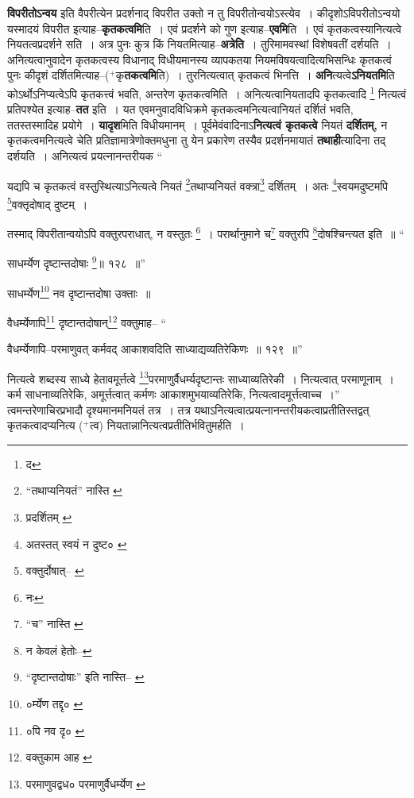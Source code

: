 \documentclass[article,12pt,a4paper]{memoir}
\newcommand{\add}[1]{($^{+}$#1)}
\begin{document}
	  \pstart \textbf{विपरीतोऽन्वय} इति वैपरीत्येन प्रदर्शनाद् विपरीत उक्तो न तु विपरीतोन्वयोऽस्त्येव । कीदृशोऽविपरीतोऽन्वयो यस्मादयं विपरीत इत्याह--\textbf{कृतकत्वमि}ति । एवं प्रदर्शने को गुण इत्याह--\textbf{एवमि}ति । एवं कृतकत्वस्यानित्यत्वे नियतत्वप्रदर्शने सति । अत्र पुनः कुत्र किं नियतमित्याह--\textbf{अत्रेति} । तुरिमामवस्थां विशेषवतीं दर्शयति । अनित्यत्वानुवादेन कृतकत्वस्य विधानाद् विधीयमानस्य व्यापकतया नियमविषयत्वादित्यभिसन्धिः कृतकत्वं पुनः कीदृशं दर्शितमित्याह--\add{कृ\textbf{तकत्वमि}ति} । तुरनित्यत्वात् कृतकत्वं भिनत्ति । \textbf{अनि}त्यत्वे\textbf{ऽनियतमि}ति कोऽर्थोऽनिप्यत्वेऽपि कृतकत्त्वं भवति, अन्तरेण कृतकत्वमिति । अनित्यत्वानियतादपि कृतकत्वादि \footnote{द} नित्यत्वं प्रतिपश्येत इत्याह--\textbf{तत} इति । यत एवमनुवादविधिक्रमे कृतकत्वमनित्यत्वानियतं दर्शितं भवति, ततस्तस्मादिह प्रयोगे । \textbf{यादृश}मिति विधीयमानम् । पूर्वमेवंवादिनाऽ\textbf{नित्यत्वं कृतकत्वे} नियतं \textbf{दर्शितम्,} न कृतकत्वमनित्यत्वे चेति प्रतिज्ञामात्रेणोक्तमधुना तु येन प्रकारेण तस्यैव प्रदर्शनमायातं \textbf{तथाही}त्यादिना तद् दर्शयति । अनित्यत्वं प्रयत्नानन्तरीयक  \leavevmode{} “
	  
	यद्यपि च कृतकत्वं वस्तुस्थित्याऽनित्यत्वे नियतं \footnote{“तथाप्यनियतं” नास्ति \cite{dp-msB}}\-तथाप्यनियतं वक्त्रा\footnote{प्रदर्शितम् \cite{dp-msC}} दर्शितम् । अतः \footnote{अतस्तत् स्वयं न दुष्ट० \cite{dp-msA} \cite{dp-msB} \cite{dp-edP} \cite{dp-edH} \cite{dp-edE} \cite{dp-edN}}\-स्वयमदुष्टमपि \footnote{वक्तुर्दोषात्--\cite{dp-msA} \cite{dp-edP} \cite{dp-edH} \cite{dp-edE}}\-वक्तृदोषाद् दुष्टम् । 
	  
	तस्माद् विपरीतान्वयोऽपि वक्तुरपराधात्, न वस्तुतः \footnote{नः} । परार्थानुमाने च\footnote{“च” नास्ति \cite{dp-msC} \cite{dp-msD}} वक्तुरपि \footnote{न केवलं हेतोः--\cite{dp-msD-n}}\-दोषश्चिन्त्यत इति ॥ “
	  
	साधर्म्येण दृष्टान्तदोषाः \footnote{“दृष्टान्तदोषाः” इति नास्ति--\cite{dp-msB} \cite{dp-edP} \cite{dp-edH} \cite{dp-edE} \cite{dp-edN}}\-॥ १२८ ॥” 
	  
	साधर्म्येण\footnote{०र्म्येण तद्दृ० \cite{dp-msB}} नव दृष्टान्तदोषा उक्ताः ॥ 
	  
	वैधर्म्येणापि\footnote{०पि नव दृ० \cite{dp-msA} \cite{dp-edP} \cite{dp-edH} \cite{dp-edE} \cite{dp-edN}} दृष्टान्तदोषान्\footnote{वक्तुकाम आह \cite{dp-msB} \cite{dp-msD}} वक्तुमाह-- “
	  
	वैधर्म्येणापि--परमाणुवत् कर्मवद् आकाशवदिति साध्याद्यव्यतिरेकिणः ॥ १२९ ॥” 
	  
	नित्यत्वे शब्दस्य साध्ये हेतावमूर्त्तत्वे \footnote{परमाणुवद्वध० \cite{dp-msA} \cite{dp-edP} \cite{dp-edH} \cite{dp-edE} परमाणुर्वैधर्म्येण \cite{dp-msC}}\-परमाणुर्वैधर्म्यदृष्टान्तः साध्याव्यतिरेकी । नित्यत्वात् परमाणूनाम् । कर्म साधनाव्यतिरेकि, अमूर्त्तत्वात् कर्मणः आकाशमुभयाव्यतिरेकि, नित्यत्वादमूर्त्तत्वाच्च ।” त्वमन्तरेणाचिरप्रभादौ दृश्यमानमनियतं तत्र । तत्र यथाऽनित्यत्वात्प्रयत्नानन्तरीयकत्वाप्रतीतिस्तद्वत् कृतकत्वादप्यनित्य \add{त्व} नियतान्नानित्यत्वप्रतीतिर्भवितुमर्हति ।
	\pend
      
\end{document}
